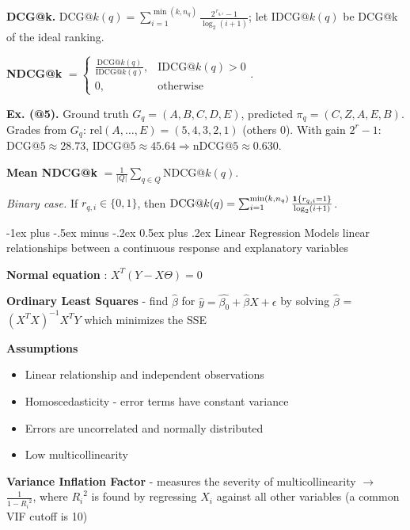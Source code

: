 \documentclass[10pt,landscape]{article}
\makeatletter
\renewcommand{\section}{\@startsection{section}{1}{0mm}%
                                {-1ex plus -.5ex minus -.2ex}%
                                {0.5ex plus .2ex}%
                                {\normalfont\large\bfseries}}
\makeatother
\begin{document}
\begin{multicols}{3}
    \textbf{DCG@k.} $\mathrm{DCG@}k(q)=\sum_{i=1}^{\min(k,n_q)}\frac{2^{\,r_{q,i}}-1}{\log_2(i+1)}$; let $\mathrm{IDCG@}k(q)$ be DCG@k of the ideal ranking. \;

    \textbf{NDCG@k} $=\begin{cases}\frac{\mathrm{DCG@}k(q)}{\mathrm{IDCG@}k(q)},& \mathrm{IDCG@}k(q)>0\\[3pt]0,& \text{otherwise}\end{cases}$.\;

    \textbf{Ex. (@5).} Ground truth $G_q=(A,B,C,D,E)$, predicted $\pi_q=(C,Z,A,E,B)$. Grades from $G_q$: $\mathrm{rel}(A,\ldots,E)=(5,4,3,2,1)$ (others $0$). With gain $2^{r}-1$: $\mathrm{DCG@}5\approx28.73$, $\mathrm{IDCG@}5\approx45.64\Rightarrow \mathrm{nDCG@}5\approx0.630$.\;

    \textbf{Mean NDCG@k} $=\frac{1}{|Q|}\sum_{q\in Q}\mathrm{NDCG@}k(q)$.
    \vspace{.2em}

    \textit{Binary case.} If $r_{q,i}\in\{0,1\}$, then $\mathrm{DCG@}k(q)=\sum_{i=1}^{\min(k,n_q)}\frac{\mathbf{1}\{r_{q,i}=1\}}{\log_2(i+1)}$.

    \section{Linear Regression}
    Models linear relationships between a continuous response and explanatory variables

    \textbf{Normal equation} : $X^T(Y-X \Theta) = 0$

    \textbf{Ordinary Least Squares} - find $\hat{\beta}$ for $\hat{y} = \hat{\beta_{0}} + \hat{\beta}X + \epsilon$
    by solving $\hat{\beta}$ = $(X^{T}X)^{-1}X^{T}Y$ which minimizes the SSE

    \textbf{Assumptions}
    \begin{itemize}[label={--},leftmargin=4mm]
        \vspace{-1mm}
        \itemsep -.4mm
        \item Linear relationship and independent observations
        \item Homoscedasticity - error terms have constant variance
        \item Errors are uncorrelated and normally distributed
        \item Low multicollinearity
    \end{itemize}

    \textbf{Variance Inflation Factor} - measures the severity of multicollinearity $\to$ $\frac{1}{1-{R_i}^2}$, where ${R_i}^2$ is found by regressing $X_i$ against all other variables (a common VIF cutoff is 10)


\end{multicols}
\end{document}
